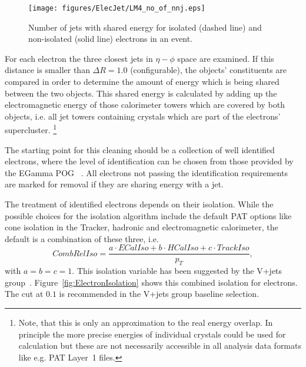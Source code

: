 \documentclass{cmspaper}
\begin{document}
\begin{figure}[hbt]
  \begin{center}
    \texttt{[image: figures/ElecJet/LM4\_no\_of\_nnj.eps]}
    \caption{Number of jets with shared energy for isolated (dashed line) and
    non-isolated (solid line) electrons in an event.}
    \label{fig:NbJets}
  \end{center}
\end{figure}

For each electron the three closest jets in \( \eta-\phi\) space are
examined. If this distance is smaller than $\Delta R=1.0$ (configurable), the
objects' constituents are compared in order to determine the amount of energy
which is being shared between the two objects.
This shared energy is calculated by adding up the electromagnetic energy of
those calorimeter towers which are covered by both objects, i.e. all jet towers
containing crystals which are part of the electrons' supercluster.
\footnote{Note, that this is only an approximation to the real energy overlap.
In principle the more precise energies of individual crystals could be used for
calculation but these are not necessarily accessible in all analysis data
formats like e.g. PAT Layer~1 files.}

The starting point for this cleaning should be a collection of well identified
electrons, where the level of identification can be chosen from those provided
by the EGamma POG ~\cite{elecID}. All electrons not passing the identification
requirements are marked for removal if they are sharing energy with a jet.

The treatment of identified electrons depends on their isolation. While the
possible choices for the isolation algorithm include the default PAT options
like cone isolation in the Tracker, hadronic and electromagnetic calorimeter,
the default is a combination of these three, i.e. 
\begin{equation}
    CombRelIso=\frac{a\cdot ECalIso+b\cdot HCalIso+c\cdot TrackIso}{p_T},
    \label{ElIsolation}
\end{equation}
with \(a=b=c=1\). This isolation variable has been suggested by the V+jets
group~\cite{vplusjets}. Figure~\ref{fig:ElectronIsolation} shows this combined
isolation for electrons. The cut at \(0.1\) is recommended in the V+jets
group baseline selection.
\end{document}
